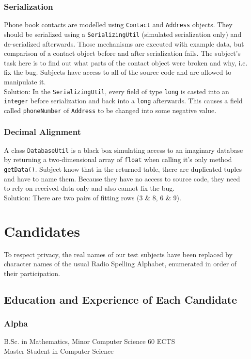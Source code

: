 \documentclass{report}
\begin{document}
\subsubsection*{Serialization}
Phone book contacts are modelled using \verb.Contact. and \verb.Address. objects. They should be serialized using a \verb.SerializingUtil. (simulated serialization only) and de-serialized afterwards.
Those mechanisms are executed with example data, but comparison of a contact object before and after serialization fails. The subject's task here is to find out what parts of the contact object were broken and why, i.e. fix the bug. Subjects have access to all of the source code and are allowed to manipulate it.\\
Solution: In the \verb.SerializingUtil., every field of type \verb.long. is casted into an \verb.integer. before serialization and back into a \verb.long. afterwards. This causes a field called \verb.phoneNumber. of \verb.Address. to be changed into some negative value.

\subsubsection*{Decimal Alignment}
A class \verb.DatabaseUtil. is a black box simulating access to an imaginary database by returning a two-dimensional array of \verb.float. when calling it's only method \verb.getData().. Subject know that in the returned table, there are duplicated tuples and have to name them. Because they have no access to source code, they need to rely on received data only and also cannot fix the bug.\\
Solution: There are two pairs of fitting rows (3 \& 8, 6 \& 9).

\section*{Candidates}
To respect privacy, the real names of our test subjects have been replaced by character names of the usual Radio Spelling Alphabet, enumerated in order of their participation.

\subsection*{Education and Experience of Each Candidate}
\subsubsection*{Alpha} %
B.Sc. in Mathematics, Minor Computer Science 60 ECTS\\
Master Student in Computer Science
\end{document}
